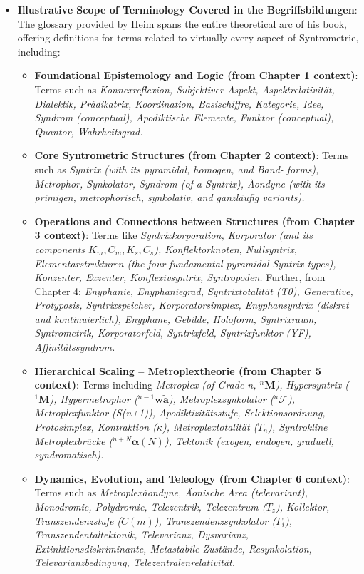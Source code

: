 \documentclass[12pt]{article}
\begin{document}
\begin{itemize}
    \item \textbf{Illustrative Scope of Terminology Covered in the Begriffsbildungen}:
    The glossary provided by Heim spans the entire theoretical arc of his book, offering definitions for terms related to virtually every aspect of Syntrometrie, including:
    \begin{itemize}
        \item \textbf{Foundational Epistemology and Logic (from Chapter 1 context)}: Terms such as \textit{Konnexreflexion, Subjektiver Aspekt, Aspektrelativität, Dialektik, Prädikatrix, Koordination, Basischiffre, Kategorie, Idee, Syndrom (conceptual), Apodiktische Elemente, Funktor (conceptual), Quantor, Wahrheitsgrad.}
        \item \textbf{Core Syntrometric Structures (from Chapter 2 context)}: Terms such as \textit{Syntrix (with its pyramidal, homogen, and Band- forms), Metrophor, Synkolator, Syndrom (of a Syntrix), Äondyne (with its primigen, metrophorisch, synkolativ, and ganzläufig variants).}
        \item \textbf{Operations and Connections between Structures (from Chapter 3 context)}: Terms like \textit{Syntrixkorporation, Korporator (and its components \( K_m, C_m, K_s, C_s \)), Konflektorknoten, Nullsyntrix, Elementarstrukturen (the four fundamental pyramidal Syntrix types), Konzenter, Exzenter, Konflexivsyntrix, Syntropoden.} Further, from Chapter 4: \textit{Enyphanie, Enyphaniegrad, Syntrixtotalität (T0), Generative, Protyposis, Syntrixspeicher, Korporatorsimplex, Enyphansyntrix (diskret and kontinuierlich), Enyphane, Gebilde, Holoform, Syntrixraum, Syntrometrik, Korporatorfeld, Syntrixfeld, Syntrixfunktor (YF), Affinitätssyndrom.}
        \item \textbf{Hierarchical Scaling – Metroplextheorie (from Chapter 5 context)}: Terms including \textit{Metroplex (of Grade n, \( {}^n\mathbf{M} \)), Hypersyntrix (\( {}^1\mathbf{M} \)), Hypermetrophor (\( {}^{n-1}\mathbf{w\widetilde{a}} \)), Metroplexsynkolator (\( {}^n\mathcal{F} \)), Metroplexfunktor (S(n+1)), Apodiktizitätsstufe, Selektionsordnung, Protosimplex, Kontraktion (\(\kappa\)), Metroplextotalität (\( T_n \)), Syntrokline Metroplexbrücke (\( {}^{n+N}\bm{\alpha}(N) \)), Tektonik (exogen, endogen, graduell, syndromatisch).}
        \item \textbf{Dynamics, Evolution, and Teleology (from Chapter 6 context)}: Terms such as \textit{Metroplexäondyne, Äonische Area (televariant), Monodromie, Polydromie, Telezentrik, Telezentrum (\(T_z\)), Kollektor, Transzendenzstufe (\(C(m)\)), Transzendenzsynkolator (\(\Gamma_i\)), Transzendentaltektonik, Televarianz, Dysvarianz, Extinktionsdiskriminante, Metastabile Zustände, Resynkolation, Televarianzbedingung, Telezentralenrelativität.}

\end{itemize}
\end{itemize}
\end{document}
